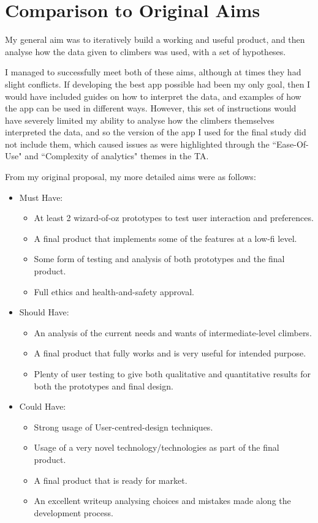 \section{Comparison to Original Aims}
My general aim was to iteratively build a working and useful product, and then analyse how the data given to climbers was used, with a set of hypotheses.

I managed to successfully meet both of these aims, although at times they had slight conflicts.
If developing the best app possible had been my only goal, then I would have included guides on how to interpret the data, and examples of how the app can be used in different ways.
However, this set of instructions would have severely limited my ability to analyse how the climbers themselves interpreted the data, and so the version of the app I used for the final study did not include them, which caused issues as were highlighted through the ``Ease-Of-Use" and ``Complexity of analytics" themes in the TA.


From my original proposal, my more detailed aims were as follows:
\begin{itemize}
    \item Must Have:
    \begin{itemize}
        \item  At least 2 wizard-of-oz prototypes to test user interaction and preferences.
        \item A final product that implements some of the features at a low-fi level.
        \item  Some form of testing and analysis of both prototypes and the final product.
        \item Full ethics and health-and-safety approval.
    \end{itemize}
    
    \item Should Have:
    \begin{itemize}
        \item An analysis of the current needs and wants of intermediate-level climbers.
        \item A final product that fully works and is very useful for intended purpose.
        \item Plenty of user testing to give both qualitative and quantitative results for both the prototypes and final design.
    \end{itemize}
    
    \item Could Have: 
    \begin{itemize}
        \item Strong usage of User-centred-design techniques.
        \item Usage of a very novel technology/technologies as part of the final product.
        \item A final product that is ready for market.
        \item An excellent writeup analysing choices and mistakes made along the development process.
    \end{itemize}
\end{itemize}

